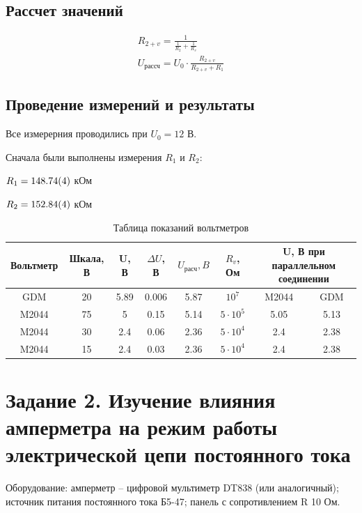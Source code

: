 \documentclass[a4paper,14pt]{article}
\begin{document}
\subsection {Рассчет значений}
\begin{equation}
\begin{aligned}
R_{2+v}  = \frac{1}{\frac{1}{R_2} + \frac{1}{R_v}}\\
 U_{\text{рассч}}  = U_0 \cdot \frac{R_{2+v}}{R_{2+v} + R_1}
 \label{rast}
 \end{aligned}
\end{equation}


\subsection {Проведение измерений и результаты}

Все измерерния проводились при $U_0 = 12$ В. 

Сначала были выполнены измерения $R_1$ и $R_2$:

$R_1 = \num{148.74 \pm 0.04}$ кОм

$R_2 = \num{152.84 \pm 0.04}$ кОм



\begin{table}[htbp]
  \centering
  \caption{Таблица показаний вольтметров}
  \label{tab:my_label}
  \begin{tabular}{|c|c|c|c|c|c|c|c|}
    \hline
    Вольтметр & Шкала, В & U, В & $\Delta U$, В & $U_{\text{расч}}, B$  & $R_v$, Ом & \multicolumn{2}{|c|}{U, В при параллельном соединении}    \\ \hline
    GDM & 20 & 5.89 & 0.006 & 5.87 & $10^7$ & M2044 & GDM \\ \hline
    M2044 & 75  & 5 & 0.15 & 5.14 & $5\cdot 10^5$ & 5.05 & 5.13\\ \hline
    M2044 & 30 & 2.4 & 0.06 & 2.36 & $5\cdot 10^4$ & 2.4 & 2.38 \\ \hline
    M2044 & 15 & 2.4 & 0.03 & 2.36 & $5\cdot 10^4$ & 2.4 & 2.38 \\ \hline

  \end{tabular}
\end{table}

\section {Задание 2. Изучение влияния амперметра на режим
работы электрической цепи постоянного тока}
Оборудование: амперметр – цифровой мультиметр DT838 (или
аналогичный); источник питания постоянного тока Б5-47; панель с
сопротивлением R 10 Ом.
\end{document}
